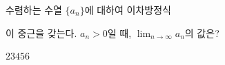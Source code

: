 수렴하는 수열 $\{a_n\}$에 대하여 이차방정식 \par\smallskip{}\par\smallskip\noindent 이 중근을 갖는다. $a_n>0$일 때, $\displaystyle\lim_{n\to\infty}a_n$의 값은?
\begin{choices32}{$2$}{$3$}{$4$}{$5$}{$6$}\end{choices32}
